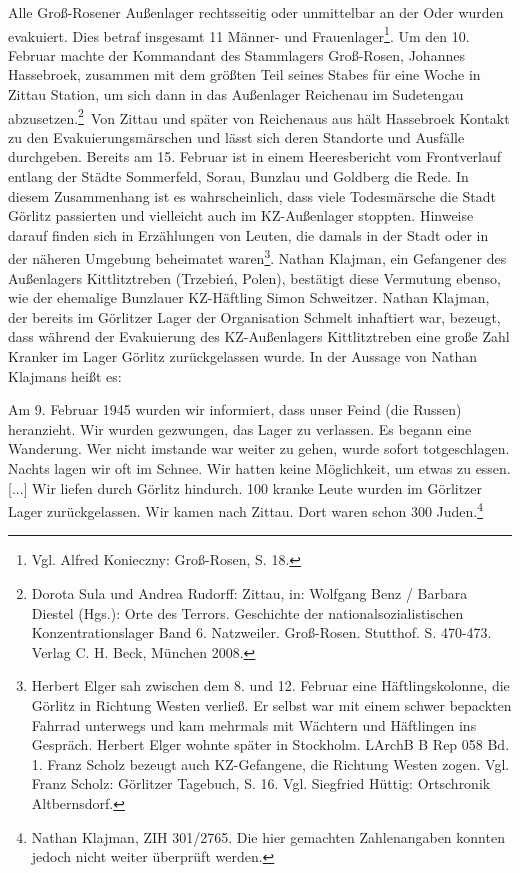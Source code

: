 Alle Groß-Rosener Außenlager rechtsseitig oder unmittelbar an der Oder wurden evakuiert. Dies betraf insgesamt 11 Männer- und Frauenlager\footnote{Vgl. Alfred Konieczny: Groß-Rosen, S. 18.}.
\glqq Um den 10. Februar machte der Kommandant des Stammlagers Groß-Rosen, Johannes Hassebroek, zusammen mit dem größten Teil seines Stabes für eine Woche in Zittau Station, um sich dann in das Außenlager Reichenau im Sudetengau abzusetzen.\grqq\footnote{Dorota Sula und Andrea Rudorff: Zittau, in: Wolfgang Benz / Bar\-bara Die\-stel (Hgs.): Orte des Ter\-rors. Geschichte der nationalsozialistischen Konzentrationslager Band 6. Natzweiler. Groß-Rosen. Stutt\-hof. S. 470-473. Verlag C. H. Beck, München 2008.}~Von Zittau und später von Reichenaus aus hält Hassebroek Kontakt zu den Evakuierungsmärschen und lässt sich deren Standorte und Ausfälle durchgeben. Bereits am 15. Februar ist in einem Heeresbericht vom Frontverlauf entlang der Städte Sommerfeld, Sorau, Bunzlau und Goldberg die Rede. In diesem Zusammenhang ist es wahrscheinlich, dass viele Todesmärsche die Stadt Görlitz passierten und vielleicht auch im KZ-Außenlager stoppten. Hinweise darauf finden sich in Erzählungen von Leuten, die damals in der Stadt oder in der näheren Umgebung beheimatet waren\footnote{Herbert Elger sah zwischen dem 8. und 12. Februar eine Häftlingskolonne, die Görlitz in Richtung Westen verließ. Er selbst war mit einem schwer bepackten Fahrrad unterwegs und kam mehrmals mit Wächtern und Häftlingen ins Gespräch. Herbert Elger wohnte später in Stockholm. LArchB B Rep 058 Bd. 1. Franz Scholz bezeugt auch KZ-Gefangene, die Richtung Westen zogen. Vgl. Franz Scholz: Görlitzer Tagebuch, S. 16. Vgl. Siegfried Hüttig: Ortschronik Altbernsdorf.}.
Nathan Klajman, ein Gefangener des Außenlagers Kittlitztreben (Trzebień, Polen), bestätigt diese Vermutung ebenso, wie der ehemalige Bunzlauer KZ-Häftling Simon Schweitzer. 
\newline
Nathan Klajman, der bereits im Görlitzer Lager der Organisation Schmelt inhaftiert war, bezeugt, dass während der Evakuierung des KZ-Außenlagers Kittlitztreben eine große Zahl Kranker im Lager Görlitz zurückgelassen wurde.\newline 
In der Aussage von Nathan Klajmans heißt es:
\begin{leftbar}
Am 9. Februar 1945 wurden wir informiert, dass unser Feind (die Russen) heranzieht.
Wir wurden gezwungen, das Lager zu verlassen. Es begann eine Wanderung. Wer nicht imstande war weiter zu gehen, wurde sofort totgeschlagen. Nachts lagen wir oft im Schnee. Wir hatten keine Möglichkeit, um etwas zu essen. [...] Wir liefen durch Görlitz hindurch. 100 kranke Leute wurden im Görlitzer Lager zurückgelassen. Wir kamen nach Zittau. Dort waren schon 300 Juden.\footnote{Nathan Klajman, ZIH 301/2765. Die hier gemachten Zahlenangaben konnten jedoch nicht weiter überprüft werden.}
\end{leftbar}

